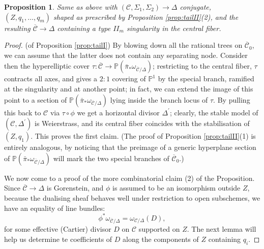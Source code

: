 \documentclass[11pt]{amsart}
\newcommand{\PP}{\mathbb P}
\renewcommand{\to}{\rightarrow}
\newcommand{\dvr}{\Delta}
\theoremstyle{plain}
\newtheorem{prop}[thm]{Proposition}
\theoremstyle{definition}
\begin{document}
\begin{prop}\label{prop:contractionII}
 Same as above with $(\mathcal C,\Sigma_1,\Sigma_2)\to \Delta$ conjugate, $(Z,q_1,\ldots,q_m)$ shaped as prescribed by Proposition \ref{prop:tailII}(2), and the resulting $\overline{\mathcal C}\to\dvr$ containing a type $I\!I_m$ singularity in the central fiber.
\end{prop}

\begin{proof}(of Proposition \ref{prop:tailI}) By blowing down all the rational trees on $\overline{\mathcal C}_0$, we can assume that the latter does not contain any separating node. Consider then the hyperelliptic cover $\tau\colon\overline{\mathcal C}\to\PP(\bar\pi_*\omega_{\overline{\mathcal C}/\dvr})$; restricting to the central fiber, $\tau$ contracts all axes, and gives a $2:1$ covering of $\PP^1$ by the special branch, ramified at the singularity and at another point; in fact, we can extend the image of this point to a section of $\PP(\bar\pi_*\omega_{\overline{\mathcal C}/\dvr})$ lying inside the branch locus of $\tau$. By pulling this back to $\mathcal C$ via $\tau\circ\phi$ we get a horizontal divisor $\Delta^\prime$; clearly, the stable model of $(\mathcal C,\Delta^\prime)$ is Weierstrass, and its central fiber coincides with the stabilisation of $(Z,q_1)$. This proves the first claim. (The proof of Proposition \ref{prop:tailII}(1) is entirely analogous, by noticing that the preimage of a generic hyperplane section of $\PP(\bar\pi_*\omega_{\overline{\mathcal C}/\dvr})$ will mark the two special branches of $\overline{\mathcal C}_0$.)

We now come to a proof of the more combinatorial claim (2) of the Proposition. Since $\overline{\mathcal C}\to \Delta$ is Gorenstein, and $\phi$ is assumed to be an isomorphism outside $Z$, because the dualising sheaf behaves well under restriction to open subschemes, we have an equality of line bundles:
\[ \phi^*\omega_{\overline{\mathcal C}/\dvr}=\omega_{\mathcal C/\dvr}(D),\]
for some effective (Cartier) divisor $D$ on $\mathcal C$ supported on $Z$. The next lemma will help us determine te coefficients of $D$ along the components of $Z$ containing $q_i$.


\end{proof}
\end{document}
